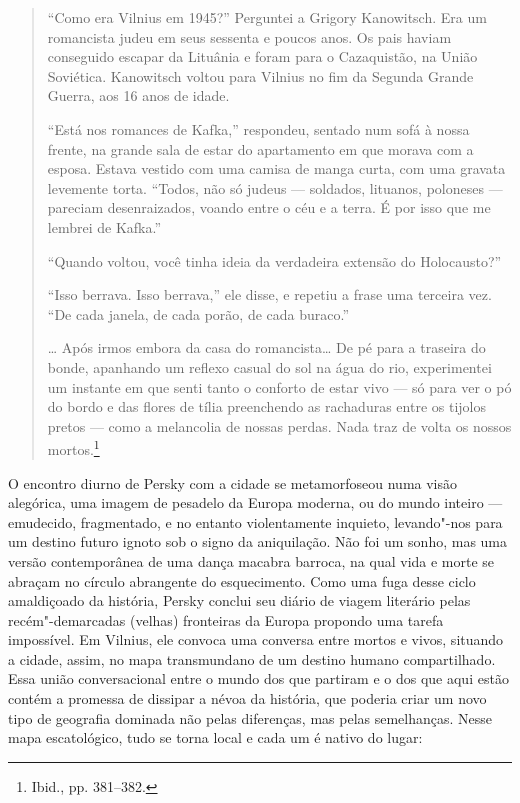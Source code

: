 \begin{quote}
``Como era Vilnius em 1945?'' Perguntei a Grigory Kanowitsch. Era um
romancista judeu em seus sessenta e poucos anos. Os pais haviam
conseguido escapar da Lituânia e foram para o Cazaquistão, na União
Soviética. Kanowitsch voltou para Vilnius no fim da Segunda Grande
Guerra, aos 16 anos de idade.

``Está nos romances de Kafka,'' respondeu, sentado num sofá à nossa
frente, na grande sala de estar do apartamento em que morava com a
esposa. Estava vestido com uma camisa de manga curta, com uma gravata
levemente torta. ``Todos, não só judeus --- soldados, lituanos, poloneses
--- pareciam desenraizados, voando entre o céu e a terra. É por isso que
me lembrei de Kafka.''

``Quando voltou, você tinha ideia da verdadeira extensão do
Holocausto?''

``Isso berrava. Isso berrava,'' ele disse, e repetiu a frase uma
terceira vez. ``De cada janela, de cada porão, de cada buraco.''

\ldots{} Após irmos embora da casa do romancista\ldots{} De pé para a
traseira do bonde, apanhando um reflexo casual do sol na água do rio,
experimentei um instante em que senti tanto o conforto de estar vivo ---
só para ver o pó do bordo e das flores de tília preenchendo as
rachaduras entre os tijolos pretos --- como a melancolia de nossas perdas.
Nada traz de volta os nossos mortos.\footnote{Ibid., pp. 381--382.}
\end{quote}

O encontro diurno de Persky com a cidade se metamorfoseou numa visão
alegórica, uma imagem de pesadelo da Europa moderna, ou do mundo inteiro
--- emudecido, fragmentado, e no entanto violentamente inquieto,
levando"-nos para um destino futuro ignoto sob o signo da aniquilação.
Não foi um sonho, mas uma versão contemporânea de uma dança macabra
barroca, na qual vida e morte se abraçam no círculo abrangente do
esquecimento. Como uma fuga desse ciclo amaldiçoado da história, Persky
conclui seu diário de viagem literário pelas recém"-demarcadas (velhas)
fronteiras da Europa propondo uma tarefa impossível. Em Vilnius, ele
convoca uma conversa entre mortos e vivos, situando a cidade, assim, no
mapa transmundano de um destino humano compartilhado. Essa união
conversacional entre o mundo dos que partiram e o dos que aqui estão
contém a promessa de dissipar a névoa da história, que poderia criar um
novo tipo de geografia dominada não pelas diferenças, mas pelas
semelhanças. Nesse mapa escatológico, tudo se torna local e cada um é
nativo do lugar:

